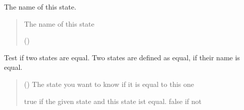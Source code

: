 \documentclass[letterpaper,10pt,english]{sphinxmanual}
\begin{document}
\begin{fulllineitems}
\begin{fulllineitems}
\end{fulllineitems}


\begin{fulllineitems}
\label{\detokenize{apidoc/src.osm_configurator.view.states:src.osm_configurator.view.states.state.State.get_state_name}}
\pysigstartsignatures
{}
\pysigstopsignatures
\sphinxAtStartPar
The name of this state.
\begin{quote}\begin{description}
\sphinxAtStartPar
The name of this state

\sphinxAtStartPar
({\hyperref[\detokenize{apidoc/src.osm_configurator.view.states:src.osm_configurator.view.states.state_name_enum.StateName}]{}})

\end{description}\end{quote}

\end{fulllineitems}


\begin{fulllineitems}
\label{\detokenize{apidoc/src.osm_configurator.view.states:src.osm_configurator.view.states.state.State.equals}}
\pysigstartsignatures
{}
\pysigstopsignatures
\sphinxAtStartPar
Test if two states are equal.
Two states are defined as equal, if their name is equal.
\begin{quote}\begin{description}
\sphinxAtStartPar
{} ({\hyperref[\detokenize{apidoc/src.osm_configurator.view.states:src.osm_configurator.view.states.state.State}]{}}) \textendash{} The state you want to know if it is equal to this one

\sphinxAtStartPar
true if the given state and this state ist equal. false if not

\sphinxAtStartPar
{}

\end{description}\end{quote}

\end{fulllineitems}


\end{fulllineitems}
\end{document}
